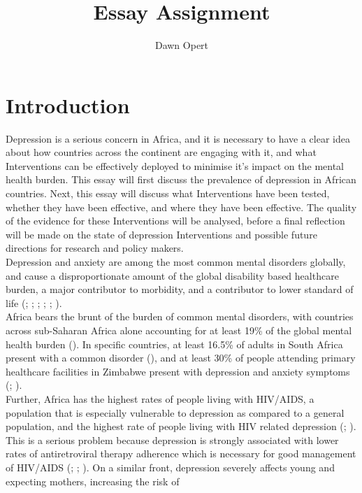 \documentclass[stu,a4paper,12pt,donotrepeattitle]{apa7}
\title{Essay Assignment}
\author{Dawn Opert}
\affiliation{OPRNET001}
\begin{document}
\maketitle
\section{Introduction}
Depression is a serious concern in Africa, and it is necessary to have a clear
idea about how countries across the continent are engaging with it, and what
Interventions can be effectively deployed to minimise it's impact on the mental
health burden. This essay will first discuss the prevalence of depression in
African countries. Next, this essay will discuss what Interventions have been
tested, whether they have been effective, and where they have been effective.
The quality of the evidence for these Interventions will be analysed, before
a final reflection will be made on the state of depression Interventions and
possible future directions for research and policy makers.\\
Depression and anxiety are among the most common mental disorders globally, and
cause a disproportionate amount of the global disability based healthcare
burden, a major contributor to morbidity, and a contributor to lower standard
of life (\cite{chibandaetal15}; \cite{chibandaetal16}; \cite{douketal21};
\cite{fernaetal21}; \cite{logetal18}; \cite{lunetal14}).\\
Africa bears the brunt of the burden of common mental disorders, with
countries across sub-Saharan Africa alone accounting for at least 19\% of the
global mental health burden (\cite{lunderal15}). In specific countries, at
least 16.5\% of adults in South Africa present with a common disorder
(\cite{lunetal14}), and at least 30\% of people attending primary healthcare
facilities in Zimbabwe present with depression and anxiety symptoms
(\cite{chibandaetal11}; \cite{chibandaetal15}).\\
Further, Africa has the highest rates of people living with HIV/AIDS, a
population that is especially vulnerable to depression as compared to a general
population, and the highest rate of people living with HIV related depression
(\cite{logetal18}; \cite{petersenetal14}). This is a serious problem because
depression is strongly associated with lower rates of antiretroviral therapy
adherence which is necessary for good management of HIV/AIDS (\cite{logetal18};
\cite{lunetal14}; \cite{petersenetal14}). On a similar front, depression
severely affects young and expecting mothers, increasing the risk of
\end{document}
